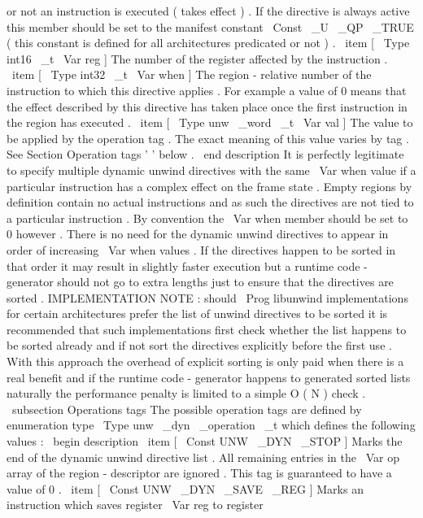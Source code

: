 or
not
an
instruction
is
executed
(
takes
effect
)
.
If
the
directive
is
always
active
this
member
should
be
set
to
the
manifest
constant
\
Const
{
\
_U
\
_QP
\
_TRUE
}
(
this
constant
is
defined
for
all
architectures
predicated
or
not
)
.
\
item
[
\
Type
{
int16
\
_t
}
\
Var
{
reg
}
]
The
number
of
the
register
affected
by
the
instruction
.
\
item
[
\
Type
{
int32
\
_t
}
\
Var
{
when
}
]
The
region
-
relative
number
of
the
instruction
to
which
this
directive
applies
.
For
example
a
value
of
0
means
that
the
effect
described
by
this
directive
has
taken
place
once
the
first
instruction
in
the
region
has
executed
.
\
item
[
\
Type
{
unw
\
_word
\
_t
}
\
Var
{
val
}
]
The
value
to
be
applied
by
the
operation
tag
.
The
exact
meaning
of
this
value
varies
by
tag
.
See
Section
Operation
tags
'
'
below
.
\
end
{
description
}
It
is
perfectly
legitimate
to
specify
multiple
dynamic
unwind
directives
with
the
same
\
Var
{
when
}
value
if
a
particular
instruction
has
a
complex
effect
on
the
frame
state
.
Empty
regions
by
definition
contain
no
actual
instructions
and
as
such
the
directives
are
not
tied
to
a
particular
instruction
.
By
convention
the
\
Var
{
when
}
member
should
be
set
to
0
however
.
There
is
no
need
for
the
dynamic
unwind
directives
to
appear
in
order
of
increasing
\
Var
{
when
}
values
.
If
the
directives
happen
to
be
sorted
in
that
order
it
may
result
in
slightly
faster
execution
but
a
runtime
code
-
generator
should
not
go
to
extra
lengths
just
to
ensure
that
the
directives
are
sorted
.
IMPLEMENTATION
NOTE
:
should
\
Prog
{
libunwind
}
implementations
for
certain
architectures
prefer
the
list
of
unwind
directives
to
be
sorted
it
is
recommended
that
such
implementations
first
check
whether
the
list
happens
to
be
sorted
already
and
if
not
sort
the
directives
explicitly
before
the
first
use
.
With
this
approach
the
overhead
of
explicit
sorting
is
only
paid
when
there
is
a
real
benefit
and
if
the
runtime
code
-
generator
happens
to
generated
sorted
lists
naturally
the
performance
penalty
is
limited
to
a
simple
O
(
N
)
check
.
\
subsection
{
Operations
tags
}
The
possible
operation
tags
are
defined
by
enumeration
type
\
Type
{
unw
\
_dyn
\
_operation
\
_t
}
which
defines
the
following
values
:
\
begin
{
description
}
\
item
[
\
Const
{
UNW
\
_DYN
\
_STOP
}
]
Marks
the
end
of
the
dynamic
unwind
directive
list
.
All
remaining
entries
in
the
\
Var
{
op
}
array
of
the
region
-
descriptor
are
ignored
.
This
tag
is
guaranteed
to
have
a
value
of
0
.
\
item
[
\
Const
{
UNW
\
_DYN
\
_SAVE
\
_REG
}
]
Marks
an
instruction
which
saves
register
\
Var
{
reg
}
to
register
